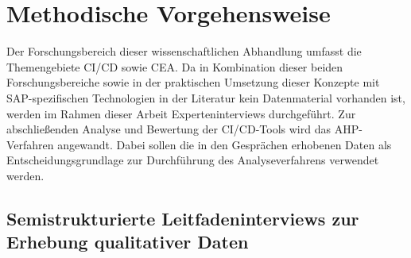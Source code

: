 \section{Methodische Vorgehensweise}
Der Forschungsbereich dieser wissenschaftlichen Abhandlung umfasst die Themengebiete CI/CD sowie CEA. Da in Kombination dieser beiden Forschungsbereiche sowie in der praktischen Umsetzung dieser Konzepte mit SAP-spezifischen Technologien in der Literatur kein Datenmaterial vorhanden ist, werden im Rahmen dieser Arbeit Experteninterviews durchgeführt. Zur abschließenden Analyse und Bewertung der CI/CD-Tools wird das AHP-Verfahren angewandt. Dabei sollen die in den Gesprächen erhobenen Daten als Entscheidungsgrundlage zur Durchführung des Analyseverfahrens verwendet werden. 
\subsection{Semistrukturierte Leitfadeninterviews zur Erhebung qualitativer Daten}
